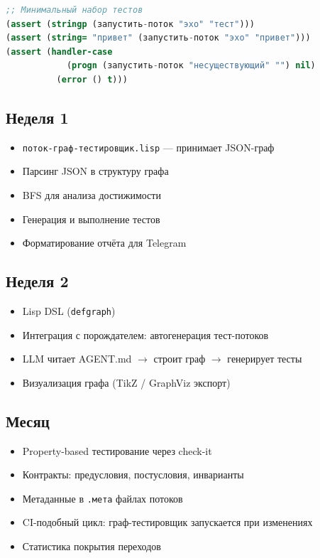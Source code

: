 \documentclass[10pt, oneside]{article}
\begin{document}
\begin{lstlisting}[language=CommonLisp,caption={MVP: базовые тесты в тесты.lisp}]
;; Минимальный набор тестов
(assert (stringp (запустить-поток "эхо" "тест")))
(assert (string= "привет" (запустить-поток "эхо" "привет")))
(assert (handler-case
            (progn (запустить-поток "несуществующий" "") nil)
          (error () t)))
\end{lstlisting}

\subsection{Неделя 1}

\begin{itemize}[leftmargin=1.5em]
  \item \texttt{поток-граф-тестировщик.lisp} --- принимает JSON-граф
  \item Парсинг JSON в структуру графа
  \item BFS для анализа достижимости
  \item Генерация и выполнение тестов
  \item Форматирование отчёта для Telegram
\end{itemize}

\subsection{Неделя 2}

\begin{itemize}[leftmargin=1.5em]
  \item Lisp DSL (\texttt{defgraph})
  \item Интеграция с порождателем: автогенерация тест-потоков
  \item LLM читает AGENT.md $\to$ строит граф $\to$ генерирует тесты
  \item Визуализация графа (TikZ / GraphViz экспорт)
\end{itemize}

\subsection{Месяц}

\begin{itemize}[leftmargin=1.5em]
  \item Property-based тестирование через check-it
  \item Контракты: предусловия, постусловия, инварианты
  \item Метаданные в \texttt{.мета} файлах потоков
  \item CI-подобный цикл: граф-тестировщик запускается при изменениях
  \item Статистика покрытия переходов
\end{itemize}
\end{document}
